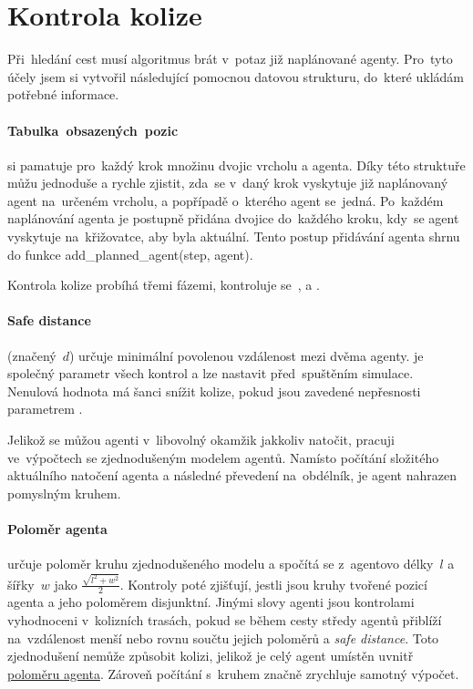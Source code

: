 \section{Kontrola kolize}\label{sec:kolize}


Při~hledání cest musí algoritmus brát v~potaz již naplánované agenty.
Pro~tyto účely jsem si vytvořil následující pomocnou datovou strukturu, do~které ukládám potřebné informace.

\paragraph{Tabulka~obsazených~pozic}\label{par:obsazene_pozice} si pamatuje pro~každý krok množinu dvojic vrcholu a agenta.
Díky této struktuře můžu jednoduše a rychle zjistit,
zda~se v~daný krok vyskytuje již naplánovaný agent na~určeném vrcholu, a popřípadě o~kterého agent se~jedná.
Po~každém naplánování agenta je postupně přidána dvojice do~každého kroku, kdy~se agent vyskytuje na~křižovatce,
aby byla  aktuální.
Tento postup přidávání agenta shrnu do funkce
\textrm{add\_planned\_agent(step, agent)}.

Kontrola kolize probíhá třemi fázemi, kontroluje se~,
 a .

\paragraph{Safe distance}\label{par:safe_distance} (značený~$d$) určuje minimální povolenou vzdálenost mezi dvěma agenty.
 je společný parametr všech kontrol a lze nastavit před~spuštěním simulace.
Nenulová hodnota  má šanci snížit kolize,
pokud jsou zavedené nepřesnosti parametrem .

Jelikož se můžou agenti v~libovolný okamžik jakkoliv natočit, pracuji ve~výpočtech se zjednodušeným modelem agentů.
Namísto počítání složitého aktuálního natočení agenta a následné převedení na~obdélník,
je agent nahrazen pomyslným kruhem.

\paragraph{Poloměr agenta}\label{par:polomer_agenta} určuje poloměr kruhu zjednodušeného modelu
a spočítá se z~agentovo délky~$l$ a šířky~$w$ jako $\frac{\sqrt {l^2 + w^2}}{2}$.
Kontroly poté zjišťují, jestli jsou kruhy tvořené pozicí agenta a jeho poloměrem disjunktní.
Jinými slovy agenti jsou kontrolami vyhodnoceni v~kolizních trasách,
pokud se během cesty středy agentů přiblíží na~vzdálenost menší nebo rovnu součtu jejich poloměrů a \emph{safe distance}.
Toto zjednodušení nemůže způsobit kolizi, jelikož je celý agent umístěn uvnitř \hyperref[par:polomer_agenta]{poloměru agenta}.
Zároveň počítání s~kruhem značně zrychluje samotný výpočet.

